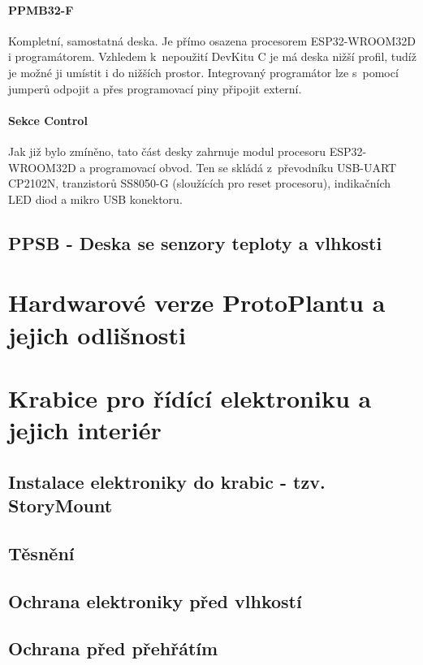 \paragraph{PPMB32-F}
Kompletní, samostatná deska. 
Je přímo osazena procesorem ESP32-WROOM32D i programátorem. 
Vzhledem k~nepoužití DevKitu C je má deska nižší profil, tudíž je možné ji umístit i do nižších prostor. 
Integrovaný programátor lze s~pomocí jumperů odpojit a přes programovací piny připojit externí.

\paragraph{Sekce Control}
Jak již bylo zmíněno, tato část desky zahrnuje modul procesoru ESP32-WROOM32D a programovací obvod. 
Ten se skládá z~převodníku USB-UART CP2102N, tranzistorů SS8050-G (sloužících pro reset procesoru), indikačních LED diod a mikro USB konektoru.

\subsection{PPSB - Deska se senzory teploty a vlhkosti}

\section{Hardwarové verze ProtoPlantu a jejich odlišnosti}

\section{Krabice pro řídící elektroniku a jejich interiér}

\subsection{Instalace elektroniky do krabic - tzv. StoryMount}

\subsection{Těsnění}

\subsection{Ochrana elektroniky před vlhkostí}

\subsection{Ochrana před přehřátím}

\newpage